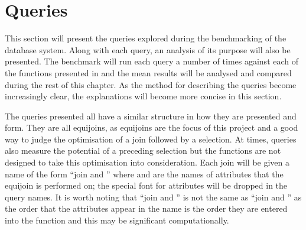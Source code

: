 \section{Queries}
This section will present the queries explored during the benchmarking of the
database system. Along with each query, an analysis of its purpose will also be
presented. The benchmark will run each query a number of times against each of
the functions presented in  and the mean results
will be analysed and compared during the rest of this chapter. As the method for
describing the queries become increasingly clear, the explanations will become
more concise in this section.

The queries presented all have a similar structure in how they are presented and
form. They are all equijoins, as equijoins are the focus of this project and a
good way to judge the optimisation of a join followed by a selection. At times,
queries also measure the potential of a preceding selection but the functions
are not designed to take this optimisation into consideration. Each join
will be given a name of the form ``join  and
'' where  and 
are the names of attributes that the equijoin is performed on; the special font
for attributes will be dropped in the query names. It is worth noting that
``join  and '' is not the same as
``join  and '' as the order that the
attributes appear in the name is the order they are entered into the function
and this may be significant computationally.

